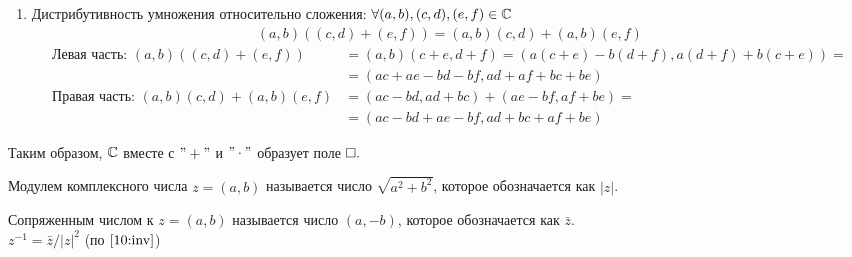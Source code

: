 \documentclass{article}
\begin{document}
\begin{enumerate}
	\item{}Дистрибутивность умножения относительно сложения: $\forall (a,b),(c,d),(e,f)\in\Cx$
	\begin{align*}
		(a,b)((c,d)+(e,f))=(a,b)(c,d)+(a,b)(e,f)
	\end{align*}
	\begin{align*}
		\text{Левая часть: }(a,b)((c,d)+(e,f))     & = (a,b)(c+e,d+f) = (a(c+e)-b(d+f),a(d+f)+b(c+e))= \\
		                                           & = (ac+ae-bd-bf,ad+af+bc+be)                       \\
		\text{Правая часть: }(a,b)(c,d)+(a,b)(e,f) & = (ac-bd,ad+bc)+(ae-bf,af+be) =                   \\
		                                           & = (ac-bd+ae-bf,ad+bc+af+be)
	\end{align*}
\end{enumerate}

Таким образом, $\Cx$ вместе с $"+"$ и $"\cdot"$ образует поле$\qed$


Модулем комплексного числа $z = (a,b)$ называется число $\sqrt{a^2 + b^2}$, которое обозначается как $|z|$.


Сопряженным числом к $z = (a,b)$ называется число $(a,-b)$, которое обозначается как $\bar{z}$.\\
$z^{-1}=\bar{z}/|z|^{2}$ (по $\eqref{10:inv}$)
\end{document}
